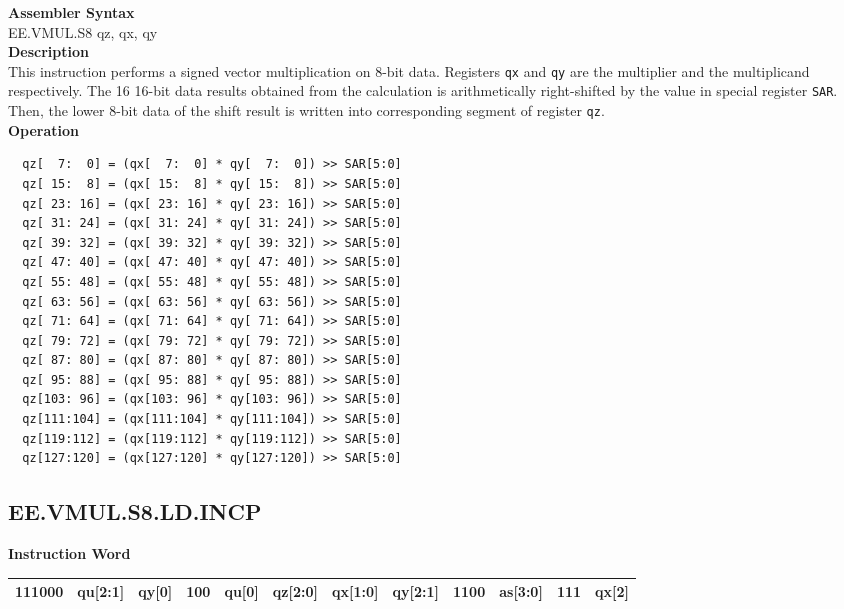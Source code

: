 \textbf{Assembler Syntax} \\
EE.VMUL.S8 qz, qx, qy \\
\textbf{Description} \\
This instruction performs a signed vector multiplication on 8-bit data. Registers \lstinline{qx} and \lstinline{qy} are the multiplier and the multiplicand respectively. The 16 16-bit data results obtained from the calculation is arithmetically right-shifted by the value in special register \lstinline{SAR}. Then, the lower 8-bit data of the shift result is written into corresponding segment of register \lstinline{qz}.\\
\textbf{Operation}
\begin{lstlisting}
  qz[  7:  0] = (qx[  7:  0] * qy[  7:  0]) >> SAR[5:0]
  qz[ 15:  8] = (qx[ 15:  8] * qy[ 15:  8]) >> SAR[5:0]
  qz[ 23: 16] = (qx[ 23: 16] * qy[ 23: 16]) >> SAR[5:0]
  qz[ 31: 24] = (qx[ 31: 24] * qy[ 31: 24]) >> SAR[5:0]
  qz[ 39: 32] = (qx[ 39: 32] * qy[ 39: 32]) >> SAR[5:0]
  qz[ 47: 40] = (qx[ 47: 40] * qy[ 47: 40]) >> SAR[5:0]
  qz[ 55: 48] = (qx[ 55: 48] * qy[ 55: 48]) >> SAR[5:0]
  qz[ 63: 56] = (qx[ 63: 56] * qy[ 63: 56]) >> SAR[5:0]
  qz[ 71: 64] = (qx[ 71: 64] * qy[ 71: 64]) >> SAR[5:0]
  qz[ 79: 72] = (qx[ 79: 72] * qy[ 79: 72]) >> SAR[5:0]
  qz[ 87: 80] = (qx[ 87: 80] * qy[ 87: 80]) >> SAR[5:0]
  qz[ 95: 88] = (qx[ 95: 88] * qy[ 95: 88]) >> SAR[5:0]
  qz[103: 96] = (qx[103: 96] * qy[103: 96]) >> SAR[5:0]
  qz[111:104] = (qx[111:104] * qy[111:104]) >> SAR[5:0]
  qz[119:112] = (qx[119:112] * qy[119:112]) >> SAR[5:0]
  qz[127:120] = (qx[127:120] * qy[127:120]) >> SAR[5:0]
\end{lstlisting}

\clearpage
\subsection{EE.VMUL.S8.LD.INCP}\label{instruction:EEVMULS8LDINCP}
\setlength\tabcolsep{6pt}
\textbf{Instruction Word} \\
\begin{tabular}{|c|c|c|c|c|c|c|c|c|c|c|c|}
	\hline
	111000 & qu[2:1] & qy[0] & 100 & qu[0] & qz[2:0] & qx[1:0] & qy[2:1] & 1100 & as[3:0] & 111 & qx[2] \\
	\hline
\end{tabular}

